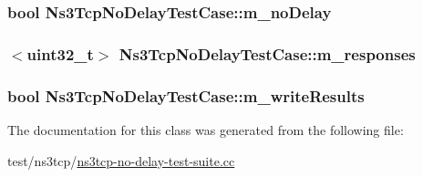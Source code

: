 \subsubsection[{\texorpdfstring{m\+\_\+no\+Delay}{m_noDelay}}]{\setlength{\rightskip}{0pt plus 5cm}bool Ns3\+Tcp\+No\+Delay\+Test\+Case\+::m\+\_\+no\+Delay\hspace{0.3cm}{\ttfamily [private]}}\hypertarget{classNs3TcpNoDelayTestCase_a630f94f010787d170954d890507cade3}{}\label{classNs3TcpNoDelayTestCase_a630f94f010787d170954d890507cade3}
\subsubsection[{\texorpdfstring{m\+\_\+responses}{m_responses}}]{$<$uint32\+\_\+t$>$ Ns3\+Tcp\+No\+Delay\+Test\+Case\+::m\+\_\+responses\hspace{0.3cm}{\ttfamily [private]}}\hypertarget{classNs3TcpNoDelayTestCase_ab02cb2b5922156135bbe2580528cb590}{}\label{classNs3TcpNoDelayTestCase_ab02cb2b5922156135bbe2580528cb590}
\subsubsection[{\texorpdfstring{m\+\_\+write\+Results}{m_writeResults}}]{\setlength{\rightskip}{0pt plus 5cm}bool Ns3\+Tcp\+No\+Delay\+Test\+Case\+::m\+\_\+write\+Results\hspace{0.3cm}{\ttfamily [private]}}\hypertarget{classNs3TcpNoDelayTestCase_adb11f9f140fb604fbf06c2aaea180656}{}\label{classNs3TcpNoDelayTestCase_adb11f9f140fb604fbf06c2aaea180656}


The documentation for this class was generated from the following file\+:\begin{DoxyCompactItemize}
\item 
test/ns3tcp/\hyperlink{ns3tcp-no-delay-test-suite_8cc}{ns3tcp-\/no-\/delay-\/test-\/suite.\+cc}\end{DoxyCompactItemize}
